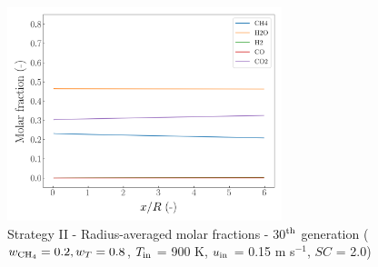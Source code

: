 \documentclass[preprint,12pt]{elsarticle}
\begin{document}
\begin{figure}[h!]
\centering
\includegraphics[width=80mm]{results/5Eq/20C_80T/GEN30-AVG.png}
\caption{\label{fig:5RES2080G30-avg} Strategy II - Radius-averaged molar fractions -  30$^{\rm{th}}$ generation ($w_{\rm{CH_4}} = 0.2, w_T = 0.8$, $T_{\rm{in}}$ = 900 K, $u_{\rm{in}}$ = 0.15 m s$^{-1}$, $SC$ = 2.0)}
\end{figure}
\end{document}
